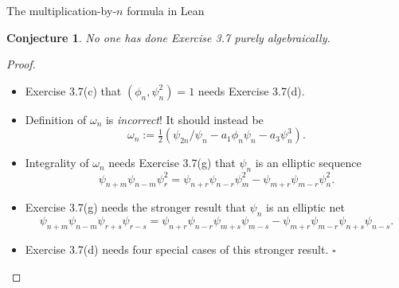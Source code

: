 \documentclass[10pt]{beamer}
\newtheorem{conjecture}{Conjecture}
\begin{document}
\begin{frame}[t]{The multiplication-by-$ n $ formula in Lean}

\begin{conjecture}
No one has done Exercise 3.7 purely algebraically.
\end{conjecture}

\pause

\begin{proof}
\renewcommand{\qedsymbol}{}
\begin{itemize}
\item Exercise 3.7(c) that $ (\phi_n, \psi_n^2) = 1 $ needs Exercise 3.7(d).

\pause

\item Definition of $ \omega_n $ is \emph{incorrect}! It should instead be
$$ \omega_n := \tfrac{1}{2}\left(\psi_{2n} / \psi_n - a_1\phi_n\psi_n - a_3\psi_n^3\right). $$

\pause

\item Integrality of $ \omega_n $ needs Exercise 3.7(g) that $ \psi_n $ is an elliptic sequence
$$ \psi_{n + m}\psi_{n - m}\psi_r^2 = \psi_{n + r}\psi_{n - r}\psi_m^2 - \psi_{m + r}\psi_{m - r}\psi_n^2. $$

\pause

\item Exercise 3.7(g) needs the stronger result that $ \psi_n $ is an elliptic net
$$ \psi_{n + m}\psi_{n - m}\psi_{r + s}\psi_{r - s} = \psi_{n + r}\psi_{n - r}\psi_{m + s}\psi_{m - s} - \psi_{m + r}\psi_{m - r}\psi_{n + s}\psi_{n - s}. $$

\pause

\item Exercise 3.7(d) needs four special cases of this stronger result. $ \square $
\end{itemize}
\vspace{-1cm}
\end{proof}

\end{frame}
\end{document}
